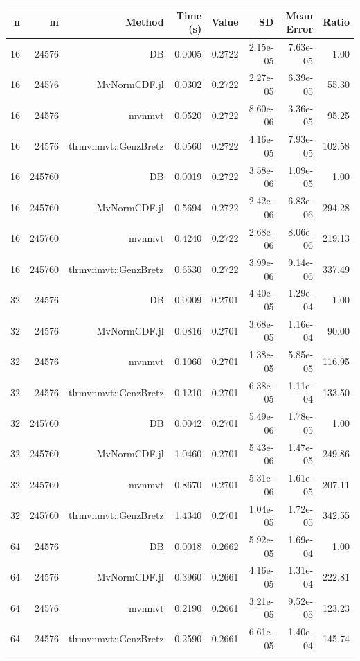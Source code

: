 \begin{tabular}{|r|r|r|r|r|r|r|r|}
  \hline
  \textbf{n} & \textbf{m} & \textbf{Method} & \textbf{Time (s)} & \textbf{Value} & \textbf{SD} & \textbf{Mean Error} & \textbf{Ratio} \\
  \hline
  16 & 24576 & DB & 0.0005 & 0.2722 & 2.15e-05 & 7.63e-05 & 1.00 \\
  16 & 24576 & MvNormCDF.jl & 0.0302 & 0.2722 & 2.27e-05 & 6.39e-05 & 55.30 \\
  16 & 24576 & mvnmvt & 0.0520 & 0.2722 & 8.60e-06 & 3.36e-05 & 95.25 \\
  16 & 24576 & tlrmvnmvt::GenzBretz & 0.0560 & 0.2722 & 4.16e-05 & 7.93e-05 & 102.58 \\
  16 & 245760 & DB & 0.0019 & 0.2722 & 3.58e-06 & 1.09e-05 & 1.00 \\
  16 & 245760 & MvNormCDF.jl & 0.5694 & 0.2722 & 2.42e-06 & 6.83e-06 & 294.28 \\
  16 & 245760 & mvnmvt & 0.4240 & 0.2722 & 2.68e-06 & 8.06e-06 & 219.13 \\
  16 & 245760 & tlrmvnmvt::GenzBretz & 0.6530 & 0.2722 & 3.99e-06 & 9.14e-06 & 337.49 \\
  32 & 24576 & DB & 0.0009 & 0.2701 & 4.40e-05 & 1.29e-04 & 1.00 \\
  32 & 24576 & MvNormCDF.jl & 0.0816 & 0.2701 & 3.68e-05 & 1.16e-04 & 90.00 \\
  32 & 24576 & mvnmvt & 0.1060 & 0.2701 & 1.38e-05 & 5.85e-05 & 116.95 \\
  32 & 24576 & tlrmvnmvt::GenzBretz & 0.1210 & 0.2701 & 6.38e-05 & 1.11e-04 & 133.50 \\
  32 & 245760 & DB & 0.0042 & 0.2701 & 5.49e-06 & 1.78e-05 & 1.00 \\
  32 & 245760 & MvNormCDF.jl & 1.0460 & 0.2701 & 5.43e-06 & 1.47e-05 & 249.86 \\
  32 & 245760 & mvnmvt & 0.8670 & 0.2701 & 5.31e-06 & 1.61e-05 & 207.11 \\
  32 & 245760 & tlrmvnmvt::GenzBretz & 1.4340 & 0.2701 & 1.04e-05 & 1.72e-05 & 342.55 \\
  64 & 24576 & DB & 0.0018 & 0.2662 & 5.92e-05 & 1.69e-04 & 1.00 \\
  64 & 24576 & MvNormCDF.jl & 0.3960 & 0.2661 & 4.16e-05 & 1.31e-04 & 222.81 \\
  64 & 24576 & mvnmvt & 0.2190 & 0.2661 & 3.21e-05 & 9.52e-05 & 123.23 \\
  64 & 24576 & tlrmvnmvt::GenzBretz & 0.2590 & 0.2661 & 6.61e-05 & 1.40e-04 & 145.74 \\

\end{tabular}
